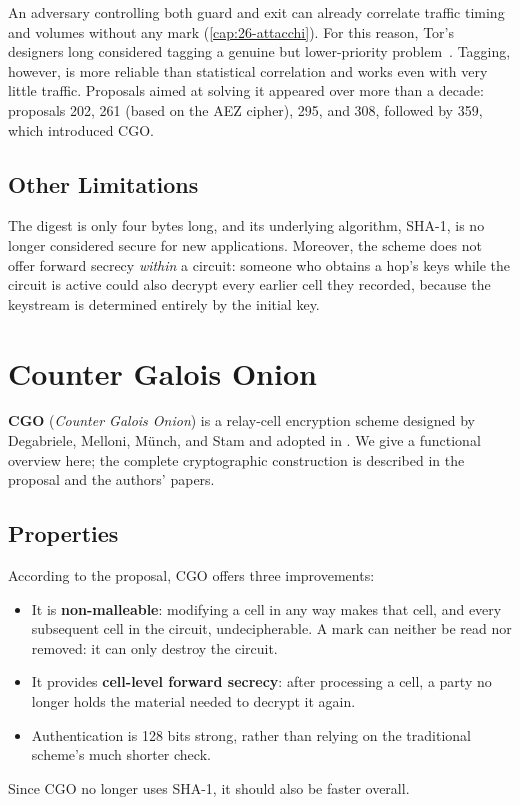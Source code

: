 \begin{approfondimento}
An adversary controlling both guard and exit can already correlate traffic timing and volumes without any mark (\cref{cap:26-attacchi}). For this reason, Tor's designers long considered tagging a genuine but lower-priority problem~\cite{dingledine2004tor}. Tagging, however, is more reliable than statistical correlation and works even with very little traffic. Proposals aimed at solving it appeared over more than a decade: proposals 202, 261 (based on the AEZ cipher), 295, and 308, followed by 359, which introduced CGO.
\end{approfondimento}

\subsection{Other Limitations}

The digest is only four bytes long, and its underlying algorithm, SHA-1, is no longer considered secure for new applications. Moreover, the scheme does not offer forward secrecy \emph{within} a circuit: someone who obtains a hop's keys while the circuit is active could also decrypt every earlier cell they recorded, because the keystream is determined entirely by the initial key.

\section{Counter Galois Onion}\label{sec:cgo}

\textbf{CGO} (\emph{Counter Galois Onion}) is a relay-cell encryption scheme designed by Degabriele, Melloni, Münch, and Stam and adopted in . We give a functional overview here; the complete cryptographic construction is described in the proposal and the authors' papers.

\subsection{Properties}

According to the proposal, CGO offers three improvements:
\begin{itemize}
  \item It is \textbf{non-malleable}: modifying a cell in any way makes that cell, and every subsequent cell in the circuit, undecipherable. A mark can neither be read nor removed: it can only destroy the circuit.
  \item It provides \textbf{cell-level forward secrecy}: after processing a cell, a party no longer holds the material needed to decrypt it again.
  \item Authentication is 128 bits strong, rather than relying on the traditional scheme's much shorter check.
\end{itemize}
Since CGO no longer uses SHA-1, it should also be faster overall.

